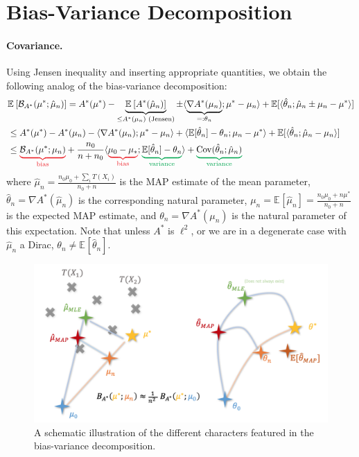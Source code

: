 \documentclass{article}
\newcommand*{\expect}[2][]{\ensuremath{\mathbb{E}_{#1} \left[ #2 \right] }} %
\newcommand{\logpart}{A}
\newcommand{\conj}{\logpart^*}
\newcommand{\bregmanconj}{\cB_{\logpart^*}}
\newcommand{\natp}{\theta}
\begin{document}
\section{Bias-Variance Decomposition}
\paragraph{Covariance.}
Using Jensen inequality and inserting appropriate quantities, we obtain the following analog of the bias-variance decomposition:
\newcommand{\bias}[1]{\textcolor{Red}{\underbrace{\textcolor{black}{#1}}_{\text{bias}}}}
\newcommand{\variance}[1]{\textcolor{Green}{\underbrace{\textcolor{black}{#1}}_{\text{variance}}}}
\begin{align}
	& \expect{\bregmanconj(\mu^* ; \hat \mu_n)} 
	= \conj(\mu^* ) 
	- \underbrace{\expect{\conj(\hat \mu_n)}}_{\leq \conj(\mu_n) \text{ (Jensen)} } 
	\pm \langle \underbrace{\nabla \conj( \mu_n)}_{=:\natp_n} ; \mu^* - \mu_n \rangle
	+ \E[\langle \hat \natp_n ; \hat \mu_n   \pm \mu_n - \mu^*  \rangle ] \nonumber \\
	& \leq \conj(\mu^* ) 
	- \conj(\mu_n) 
	- \langle  \nabla \conj( \mu_n) ; \mu^* - \mu_n \rangle
	+ \langle \E[\hat \natp_n] - \natp_n ;  \mu_n - \mu^* \rangle
	+ \E[\langle \hat \natp_n ; \hat \mu_n - \mu_n \rangle ]
	\nonumber \\
	& \leq \bias{\bregmanconj(\mu^*; \mu_n)}
	+ \frac{n_0}{n+n_0} \langle  \bias{\mu_0 - \mu_*} ; \variance{\E[\hat \natp_n] - \natp_n} \rangle 
	+ \variance{\Cov(\hat \natp_n ; \hat \mu_n ) }
\end{align}
where $\hat \mu_n = \frac{n_0 \mu_0 + \sum_i T(X_i)}{n_0 + n}$ is the MAP estimate of the mean parameter, $\hat \natp_n = \nabla \conj(\hat \mu_n)$ is the corresponding natural parameter, 
$\mu_n = \expect{\hat \mu_n} = \frac{n_0 \mu_0 + n \mu^*}{n_0 + n}$ is the expected MAP estimate,
and $\theta_n = \nabla \conj(\mu_n)$ is the natural parameter of this expectation.
Note that unless $\conj$ is $\ell^2$, or we are in a degenerate case with $\hat \mu_n$ a Dirac, $\theta_n \neq \expect{\hat \theta_n}$.

\begin{figure}[ht]
	\centering
	\includegraphics[width=.8\textwidth]{figs/bias-variance.png}
	\caption{A schematic illustration of the different characters featured in the bias-variance decomposition.}
	\label{fig:bias-variance}
\end{figure}
\end{document}

